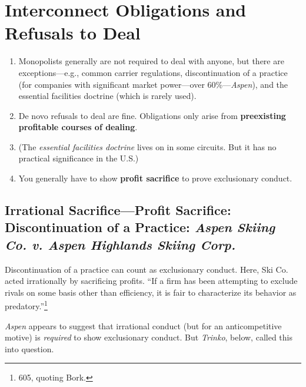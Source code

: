 \section{Interconnect Obligations and Refusals to Deal}

\begin{enumerate}
    \item Monopolists generally are not required to deal with anyone, but there 
    are exceptions---e.g., common carrier regulations, discontinuation of a 
    practice (for companies with significant market power---over 
    60\%---\emph{Aspen}), and the essential facilities doctrine (which is 
    rarely used).
    \item De novo refusals to deal are fine. Obligations only arise from 
    \textbf{preexisting profitable courses of dealing}.
    \item (The \emph{essential facilities doctrine} lives on in some circuits. 
    But it has no practical significance in the U.S.)
    \item You generally have to show \textbf{profit sacrifice} to prove 
    exclusionary conduct.
\end{enumerate}

\subsection{Irrational Sacrifice---Profit Sacrifice: Discontinuation of a 
Practice: \emph{Aspen Skiing Co. v. Aspen Highlands Skiing Corp.}}

Discontinuation of a practice can count as exclusionary conduct. Here, Ski Co.  
acted irrationally by sacrificing profits. ``If a firm has been attempting to 
exclude rivals on some basis other than efficiency, it is fair to characterize 
its behavior as predatory.''\footnote{605, quoting Bork.}

\emph{Aspen} appears to suggest that irrational conduct (but for an 
anticompetitive motive) is \emph{required} to show exclusionary conduct. But 
\emph{Trinko}, below, called this into question.

